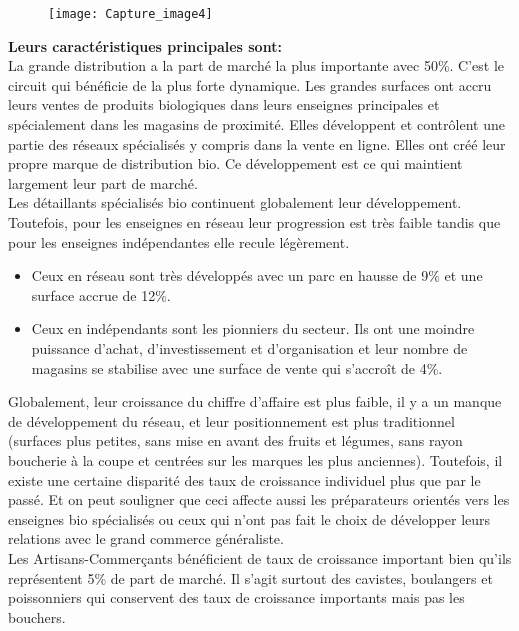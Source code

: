 \documentclass[12pt,a4paper]{report}
\begin{document}
	 \begin{figure}[h]
		\centering
		\texttt{[image: Capture\_image4]}
	\end{figure}




\textbf{Leurs caractéristiques principales sont:}\\
 
La grande distribution a la part de marché la plus importante avec 50\%. C'est le circuit qui bénéficie de la plus forte dynamique. Les grandes surfaces ont accru leurs ventes de produits biologiques dans leurs enseignes principales et spécialement dans les magasins de proximité. Elles développent et contrôlent une partie des réseaux spécialisés y compris dans la vente en ligne. Elles ont créé leur propre marque de distribution bio. Ce développement est ce qui maintient largement leur part de marché.\\

Les détaillants spécialisés bio continuent globalement leur développement. Toutefois, pour les enseignes en réseau leur progression est très faible tandis que pour les enseignes indépendantes elle recule légèrement. 
	\begin{itemize}
		\item Ceux en réseau sont très développés avec un parc en hausse de 9\% et une surface accrue de 12\%. 
		
		\item Ceux en indépendants sont les pionniers du secteur. Ils ont une moindre puissance d’achat, d’investissement et d’organisation et leur nombre de magasins se stabilise avec une surface de vente qui s’accroît de 4\%.
	\end{itemize}
	

Globalement, leur croissance du chiffre d'affaire est plus faible, il y a un manque de développement du réseau, et leur positionnement est plus traditionnel (surfaces plus petites, sans mise en avant des fruits et légumes, sans rayon boucherie à la coupe et centrées sur les marques les plus anciennes).
Toutefois, il existe une certaine disparité des taux de croissance individuel plus que par le passé. Et on peut souligner que ceci affecte aussi les préparateurs orientés vers les enseignes bio spécialisés ou ceux qui n’ont pas fait le choix de développer leurs relations avec le grand commerce généraliste.\\


Les Artisans-Commerçants bénéficient de taux de croissance important bien qu'ils représentent 5\% de part de marché. Il s'agit surtout des cavistes, boulangers et poissonniers qui conservent des taux de croissance importants mais pas les bouchers.\\
\end{document}
